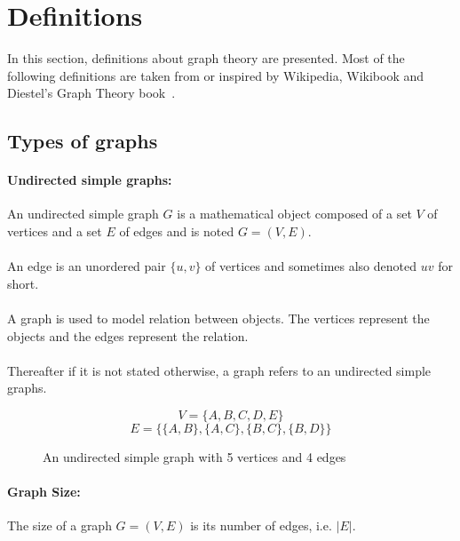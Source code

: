 \section{Definitions}
In this section, definitions about graph theory are presented. Most
of the following definitions are taken from or inspired by Wikipedia,
Wikibook and Diestel's Graph Theory book~\cite{Diestel}.

\subsection{Types of graphs}
\paragraph{Undirected simple graphs:}
An undirected simple graph $G$ is a mathematical object composed of a set $V$ of
vertices and a set $E$ of edges and is noted $G = (V,E)$.

\paragraph{}
An edge is an unordered pair $\{u,v\}$ of vertices and sometimes also denoted 
$uv$ for short.

\paragraph{}
A graph is used to model relation between objects. The vertices represent the 
objects and the edges represent the relation.

\paragraph{}
Thereafter if it is not stated otherwise, a graph refers to an undirected 
simple graphs.


\begin{figure}[!h]
  \caption{An undirected simple graph with 5 vertices and 4 edges}
  \begin{center}
    
  \end{center}
  $$V = \{A,B,C,D,E\}$$
  $$E = \Big\{\{A,B\},\{A,C\},\{B,C\},\{B,D\}\Big\}$$
\end{figure}

\paragraph{Graph Size:}
The size of a graph $G=(V,E)$ is its number of edges, i.e. $|E|$.

